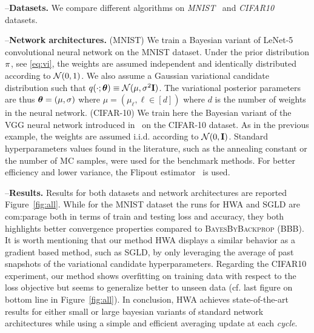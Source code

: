\documentclass[tablecaption=bottom,wcp]{jmlr} %
\begin{document}
\noindent --\textbf{Datasets.}\hspace{0.1in}
We compare different algorithms on \textit{MNIST}~\citep{lecun-mnisthandwrittendigit-2010} and \textit{CIFAR10}~\citep{krizhevsky2009learning} datasets.

\noindent --\textbf{Network architectures.} \hspace{0.1in}
(MNIST) We train a Bayesian variant of LeNet-5 convolutional neural network on the MNIST dataset. 
Under the prior distribution $\prior$, see \eqref{eq:vi}, the weights are assumed  independent and identically distributed according to ${\cal N}(0,1)$.
We also assume a Gaussian variational candidate distribution such that $q(\cdot; \param) \equiv  \mathcal{N}(\mu,\sigma^2 \Id )$.
The variational posterior parameters are thus $\param = (\mu, \sigma) $ where $\mu = (\mu_\ell, \ell \in [d])$ where $d$ is the number of weights in the neural network. 
(CIFAR-10) We train here the Bayesian variant of the VGG neural network introduced in~\citep{simonyan2014very} on the CIFAR-10 dataset.
As in the previous example, the weights are assumed i.i.d. according to ${\cal N}(0,\Id)$.
Standard hyperparameters values found in the literature, such as the annealing constant or the number of MC samples, were used for the benchmark methods. 
For better efficiency and lower variance, the Flipout estimator~\citep{wen2018flipout} is used.

\noindent --\textbf{Results.} \hspace{0.1in} 
Results for both datasets and network architectures are reported Figure~\ref{fig:all}.
While for the MNIST dataset the runs for \textsc{HWA} and \textsc{SGLD} are com:parage both in terms of train and testing loss and accuracy, they both highlights better convergence properties compared to \textsc{BayesByBackprop} (BBB).
It is worth mentioning that our method \textsc{HWA} displays a similar behavior as a gradient based method, such as \textsc{SGLD}, by only leveraging the average of past snapshots of the variational candidate hyperparameters. 
Regarding the CIFAR10 experiment, our method shows overfitting on training data with respect to the loss objective but seems to generalize better to unseen data (cf. last figure on bottom line in Figure~\ref{fig:all}).
In conclusion, \textsc{HWA} achieves state-of-the-art results for either small or large bayesian variants of standard network architectures while using a simple and efficient averaging update at each \textit{cycle}.
\end{document}
